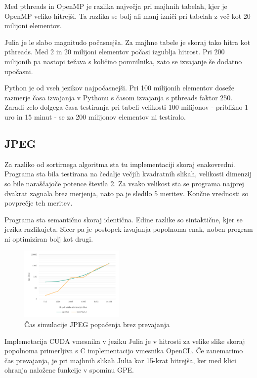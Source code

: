 \documentclass[journal,a4paper,twoside]{sty/IEEEtran}
\begin{document}
Med pthreads in OpenMP je razlika največja pri majhnih tabelah, kjer je OpenMP veliko hitrejši.
Ta razlika se bolj ali manj izniči pri tabelah z več kot 20 milijoni elementov.

Julia je le slabo magnitudo počasnejša.
Za majhne tabele je skoraj tako hitra kot pthreads.
Med 2 in 20 milijoni elementov počasi izgublja hitrost.
Pri 200 milijonih pa nastopi težava s količino pomnilnika, zato se izvajanje še dodatno upočasni.

Python je od vseh jezikov najpočasnejši.
Pri 100 milijonih elementov doseže razmerje časa izvajanja v Pythonu s časom izvajanja s pthreads faktor 250.
Zaradi zelo dolgega časa testiranja pri tabeli velikosti 100 milijonov - približno 1 uro in 15 minut - se za 200 milijonov elementov ni testiralo.

\subsection{JPEG}

Za razliko od sortirnega algoritma sta tu implementaciji skoraj enakovredni.
Programa sta bila testirana na čedalje večjih kvadratnih slikah, velikosti dimenzij so bile naraščajoče potence števila 2.
Za vsako velikost sta se programa najprej dvakrat zagnala brez merjenja, nato pa je sledilo 5 meritev.
Končne vrednosti so povprečje teh meritev.

Programa sta semantično skoraj identična.
Edine razlike so sintaktične, kjer se jezika razlikujeta.
Sicer pa je postopek izvajanja popolnoma enak, noben program ni optimiziran bolj kot drugi.

\begin{figure}[h]
\includegraphics[width=0.45\textwidth]{jpeg_speed}
\caption{Čas simulacije JPEG popačenja brez prevajanja}
\end{figure}

Implemetacija CUDA vmesnika v jeziku Julia je v hitrosti za velike slike skoraj popolnoma primerljiva s C implementacijo vmesnika OpenCL.
Če zanemarimo čas prevajanja, je pri majhnih slikah Julia kar 15-krat hitrejša, ker med klici ohranja naložene funkcije v spominu GPE.
\end{document}
